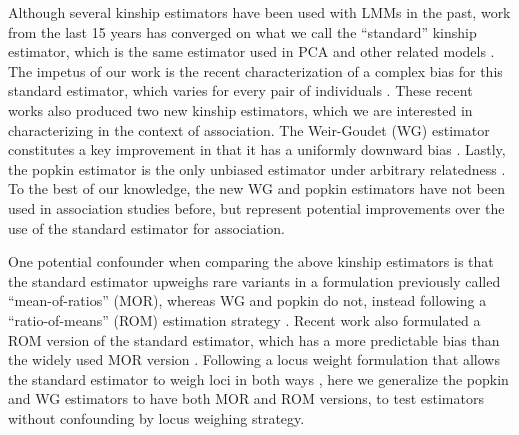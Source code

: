 \documentclass[11pt]{article}
\begin{document}
\begin{linenumbers}
Although several kinship estimators have been used with LMMs in the past, work from the last 15 years has converged on what we call the ``standard'' kinship estimator, which is the same estimator used in PCA and other related models \citep{price_principal_2006, astle_population_2009, rakovski_kinship-based_2009, thornton_roadtrips:_2010, yang_common_2010, yang_gcta:_2011, zhou_genome-wide_2012, speed_improved_2012, yang_advantages_2014, speed_relatedness_2015, loh_efficient_2015, wang_efficient_2017, sul_population_2018}.
The impetus of our work is the recent characterization of a complex bias for this standard estimator, which varies for every pair of individuals \citep{weir_unified_2017, ochoa_estimating_2021}.
These recent works also produced two new kinship estimators, which we are interested in characterizing in the context of association.
The Weir-Goudet (WG) estimator constitutes a key improvement in that it has a uniformly downward bias \citep{weir_unified_2017, ochoa_estimating_2021}.
Lastly, the popkin estimator is the only unbiased estimator under arbitrary relatedness \citep{ochoa_estimating_2021}.
To the best of our knowledge, the new WG and popkin estimators have not been used in association studies before, but represent potential improvements over the use of the standard estimator for association.

One potential confounder when comparing the above kinship estimators is that the standard estimator upweighs rare variants in a formulation previously called ``mean-of-ratios'' (MOR), whereas WG and popkin do not, instead following a ``ratio-of-means'' (ROM) estimation strategy \citep{bhatia_estimating_2013, ochoa_estimating_2021}.
Recent work also formulated a ROM version of the standard estimator, which has a more predictable bias than the widely used MOR version \citep{ochoa_estimating_2021}.
Following a locus weight formulation that allows the standard estimator to weigh loci in both ways \citep{wang_efficient_2017}, here we generalize the popkin and WG estimators to have both MOR and ROM versions, to test estimators without confounding by locus weighing strategy.


\end{linenumbers}
\end{document}
